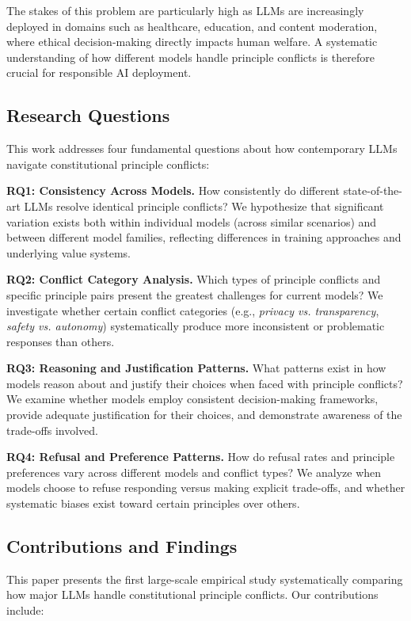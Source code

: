\documentclass[11pt,a4paper]{article}
\newcommand{\principle}[1]{\textit{#1}}
\begin{document}
The stakes of this problem are particularly high as LLMs are increasingly deployed in domains such as healthcare, education, and content moderation, where ethical decision-making directly impacts human welfare. A systematic understanding of how different models handle principle conflicts is therefore crucial for responsible AI deployment.

\subsection{Research Questions}

This work addresses four fundamental questions about how contemporary LLMs navigate constitutional principle conflicts:

\textbf{RQ1: Consistency Across Models.} How consistently do different state-of-the-art LLMs resolve identical principle conflicts? We hypothesize that significant variation exists both within individual models (across similar scenarios) and between different model families, reflecting differences in training approaches and underlying value systems.

\textbf{RQ2: Conflict Category Analysis.} Which types of principle conflicts and specific principle pairs present the greatest challenges for current models? We investigate whether certain conflict categories (e.g., \principle{privacy vs. transparency}, \principle{safety vs. autonomy}) systematically produce more inconsistent or problematic responses than others.

\textbf{RQ3: Reasoning and Justification Patterns.} What patterns exist in how models reason about and justify their choices when faced with principle conflicts? We examine whether models employ consistent decision-making frameworks, provide adequate justification for their choices, and demonstrate awareness of the trade-offs involved.

\textbf{RQ4: Refusal and Preference Patterns.} How do refusal rates and principle preferences vary across different models and conflict types? We analyze when models choose to refuse responding versus making explicit trade-offs, and whether systematic biases exist toward certain principles over others.

\subsection{Contributions and Findings}

This paper presents the first large-scale empirical study systematically comparing how major LLMs handle constitutional principle conflicts. Our contributions include:
\end{document}
